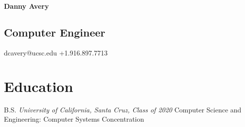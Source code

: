 \documentclass[12pt,letterpaper]{report}
\newcommand{\myname}{Danny Avery}
\newcommand{\namefont}[1]{{\normalfont\bfseries\Huge{#1}}}
\newcommand{\middlegap}{4.5em}
\newcommand{\verticalgap}{2em}
\newcommand{\degreegap}{1.2em}
\newcommand{\leftbody}{0.69\linewidth}
\newcommand{\rightcolumn}{0.18\linewidth}
\newcommand{\topandbottom}{\linewidth}
\begin{document}
	\raggedright
	\begin{minipage}[t]{\leftbody}
	\namefont{\myname}
	\vspace{\degreegap}
	\subsection*{Computer Engineer} 
	\end{minipage}
	\hspace{\middlegap}
	\begin{minipage}[t]{\rightcolumn}
		dcavery@ucsc.edu \newline
		+1.916.897.7713
	\end{minipage}
	\begin{minipage}[t]{\topandbottom}
	\vspace{\verticalgap}
	\section*{Education}
	\begin{tablist}
		\item[B.S.] \tab  \textit{University of California, Santa Cruz, Class of 2020} \newline 
		 Computer Science and Engineering: Computer Systems Concentration 
	\end{tablist}	
	\end{minipage}
%
\end{document}
